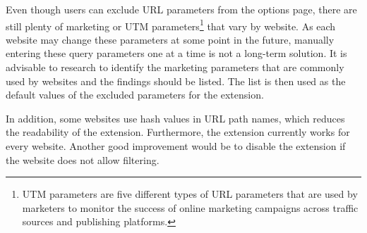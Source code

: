 Even though users can exclude URL parameters from the options page, there are still plenty of marketing or UTM parameters\footnote{UTM parameters are five different types of URL parameters that are used by marketers to monitor the success of online marketing campaigns across traffic sources and publishing platforms.} that vary by website. As each website may change these parameters at some point in the future, manually entering these query parameters one at a time is not a long-term solution. It is advisable to research to identify the marketing parameters that are commonly used by websites and the findings should be listed. The list is then used as the default values of the excluded parameters for the extension.

In addition, some websites use hash values in URL path names, which reduces the readability of the extension. Furthermore, the extension currently works for every website. Another good improvement would be to disable the extension if the website does not allow filtering.
